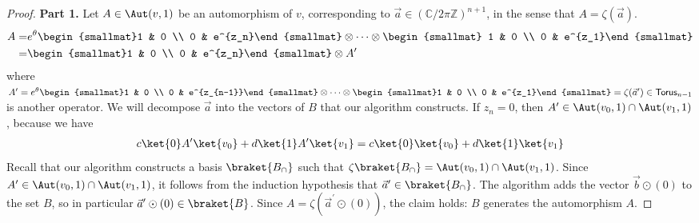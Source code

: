 \begin{proof}
	\textbf{Part 1. } Let $A\in \Aut(v,1)$ be an automorphism of $v$, corresponding to $\vec a\in (\mathbb C/2\pi \mathbb Z)^{n+1}$, in the sense that $A=\zeta(\vec a)$.
	\begin{align}
	A = & e^\theta \begin{smallmat}1 & 0 \\ 0 & e^{z_n}\end{smallmat} \otimes \cdots\otimes\begin{smallmat} 1 & 0 \\ 0 & e^{z_1}\end{smallmat} \\
	= & \begin{smallmat}1 & 0 \\ 0 & e^{z_n}\end{smallmat} \otimes A^\prime
	\end{align}
	where $A^\prime=e^\theta\begin{smallmat}1 & 0 \\ 0 & e^{z_{n-1}}\end{smallmat}\otimes\cdots\otimes\begin{smallmat}1 & 0 \\ 0 & e^{z_1}\end{smallmat}=\zeta(\vec a^\prime)\in \textsf{Torus}_{n-1}$ is another operator.
	We will decompose $\vec a$ into the vectors of $B$ that our algorithm constructs.
	If $z_n=0$, then $A^\prime\in \Aut(v_0,1)\cap \Aut(v_1,1)$, because we have
	\begin{align}
		c\ket{0}A^\prime\ket{v_0} + d\ket{1}A^\prime\ket{v_1} = c\ket{0}\ket{v_0}+d\ket{1}\ket{v_1}
	\end{align}
	Recall that our algorithm constructs a basis $\braket{B_\cap}$ such that $\zeta\braket{B_\cap}=\Aut(v_0,1)\cap  \Aut(v_1,1)$.
	Since $A^\prime\in \Aut(v_0,1)\cap \Aut(v_1,1)$, it follows from the induction hypothesis that $\vec a^\prime\in \braket{B_\cap}$.
	The algorithm adds the vector $\vec b\odot (0)$ to the set $B$, so in particular $\vec a^\prime \odot (0)\in \braket{B}$.
	Since $A=\zeta(\vec a^\prime\odot (0))$, the claim holds: $B$ generates the automorphism $A$.
	

\end{proof}
